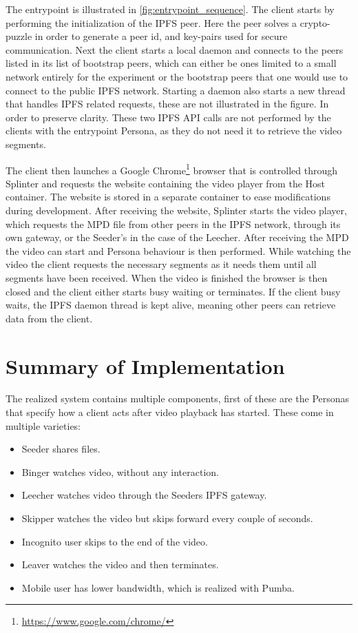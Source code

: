 The entrypoint is illustrated in \autoref{fig:entrypoint_sequence}. The client starts by performing the initialization of the \ac{IPFS} peer. Here the peer solves a crypto-puzzle in order to generate a peer id, and key-pairs used for secure communication.
Next the client starts a local daemon and connects to the peers listed in its list of bootstrap peers, which can either be ones limited to a small network entirely for the experiment or the bootstrap peers that one would use to connect to the public \ac{IPFS} network.
Starting a daemon also starts a new thread that handles \ac{IPFS} related requests, these are not illustrated in the figure. In order to preserve clarity. These two \ac{IPFS} \ac{API} calls are not performed by the clients with the entrypoint Persona, as they do not need it to retrieve the video segments.

The client then launches a Google Chrome\footnote{\url{https://www.google.com/chrome/}} browser that is controlled through Splinter and requests the website containing the video player from the Host container. The website is stored in a separate container to ease modifications during development.
After receiving the website, Splinter starts the video player, which requests the \ac{MPD} file from other peers in the \ac{IPFS} network, through its own gateway, or the Seeder's in the case of the Leecher.
After receiving the \ac{MPD} the video can start and Persona behaviour is then performed. While watching the video the client requests the necessary segments as it needs them until all segments have been received.
When the video is finished the browser is then closed and the client either starts busy waiting or terminates. If the client busy waits, the \ac{IPFS} daemon thread is kept alive, meaning other peers can retrieve data from the client.



\section{Summary of Implementation}
The realized system contains multiple components, first of these are the Personas that specify how a client acts after video playback has started. These come in multiple varieties:
\begin{itemize}
    \item Seeder shares files.
    \item Binger watches video, without any interaction.
    \item Leecher watches video through the Seeders \ac{IPFS} gateway.
    \item Skipper watches the video but skips forward every couple of seconds.
    \item Incognito user skips to the end of the video.
    \item Leaver watches the video and then terminates.
    \item Mobile user has lower bandwidth, which is realized with Pumba.
\end{itemize}

